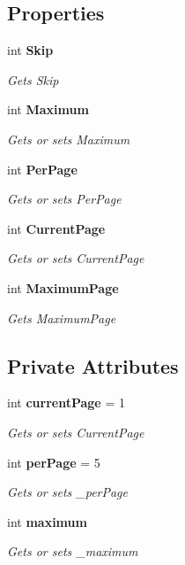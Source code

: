 \subsection*{Properties}
\begin{DoxyCompactItemize}
\item 
int \textbf{ Skip}\hspace{0.3cm}{\ttfamily  [get]}
\begin{DoxyCompactList}\small\item\em Gets Skip \end{DoxyCompactList}\item 
int \textbf{ Maximum}\hspace{0.3cm}{\ttfamily  [get, set]}
\begin{DoxyCompactList}\small\item\em Gets or sets Maximum \end{DoxyCompactList}\item 
int \textbf{ Per\+Page}\hspace{0.3cm}{\ttfamily  [get, set]}
\begin{DoxyCompactList}\small\item\em Gets or sets Per\+Page \end{DoxyCompactList}\item 
int \textbf{ Current\+Page}\hspace{0.3cm}{\ttfamily  [get, set]}
\begin{DoxyCompactList}\small\item\em Gets or sets Current\+Page \end{DoxyCompactList}\item 
int \textbf{ Maximum\+Page}\hspace{0.3cm}{\ttfamily  [get]}
\begin{DoxyCompactList}\small\item\em Gets Maximum\+Page \end{DoxyCompactList}\end{DoxyCompactItemize}
\subsection*{Private Attributes}
\begin{DoxyCompactItemize}
\item 
int \textbf{ current\+Page} = 1
\begin{DoxyCompactList}\small\item\em Gets or sets Current\+Page \end{DoxyCompactList}\item 
int \textbf{ per\+Page} = 5
\begin{DoxyCompactList}\small\item\em Gets or sets \+\_\+per\+Page \end{DoxyCompactList}\item 
int \textbf{ maximum}
\begin{DoxyCompactList}\small\item\em Gets or sets \+\_\+maximum \end{DoxyCompactList}\end{DoxyCompactItemize}



